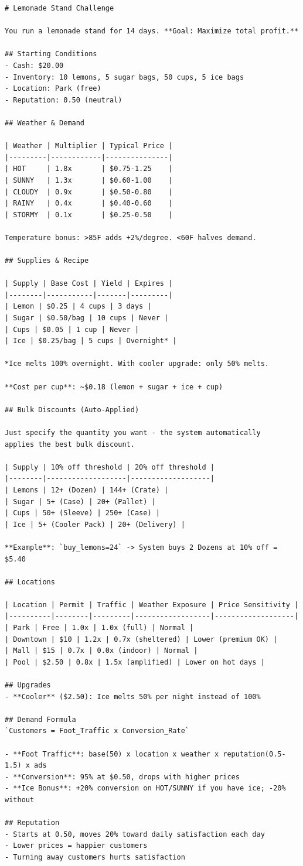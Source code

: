 \begin{verbatim}
# Lemonade Stand Challenge

You run a lemonade stand for 14 days. **Goal: Maximize total profit.**

## Starting Conditions
- Cash: $20.00
- Inventory: 10 lemons, 5 sugar bags, 50 cups, 5 ice bags
- Location: Park (free)
- Reputation: 0.50 (neutral)

## Weather & Demand

| Weather | Multiplier | Typical Price |
|---------|------------|---------------|
| HOT     | 1.8x       | $0.75-1.25    |
| SUNNY   | 1.3x       | $0.60-1.00    |
| CLOUDY  | 0.9x       | $0.50-0.80    |
| RAINY   | 0.4x       | $0.40-0.60    |
| STORMY  | 0.1x       | $0.25-0.50    |

Temperature bonus: >85F adds +2%/degree. <60F halves demand.

## Supplies & Recipe

| Supply | Base Cost | Yield | Expires |
|--------|-----------|-------|---------|
| Lemon | $0.25 | 4 cups | 3 days |
| Sugar | $0.50/bag | 10 cups | Never |
| Cups | $0.05 | 1 cup | Never |
| Ice | $0.25/bag | 5 cups | Overnight* |

*Ice melts 100% overnight. With cooler upgrade: only 50% melts.

**Cost per cup**: ~$0.18 (lemon + sugar + ice + cup)

## Bulk Discounts (Auto-Applied)

Just specify the quantity you want - the system automatically 
applies the best bulk discount.

| Supply | 10% off threshold | 20% off threshold |
|--------|-------------------|-------------------|
| Lemons | 12+ (Dozen) | 144+ (Crate) |
| Sugar | 5+ (Case) | 20+ (Pallet) |
| Cups | 50+ (Sleeve) | 250+ (Case) |
| Ice | 5+ (Cooler Pack) | 20+ (Delivery) |

**Example**: `buy_lemons=24` -> System buys 2 Dozens at 10% off = $5.40

## Locations

| Location | Permit | Traffic | Weather Exposure | Price Sensitivity |
|----------|--------|---------|------------------|-------------------|
| Park | Free | 1.0x | 1.0x (full) | Normal |
| Downtown | $10 | 1.2x | 0.7x (sheltered) | Lower (premium OK) |
| Mall | $15 | 0.7x | 0.0x (indoor) | Normal |
| Pool | $2.50 | 0.8x | 1.5x (amplified) | Lower on hot days |

## Upgrades
- **Cooler** ($2.50): Ice melts 50% per night instead of 100%

## Demand Formula
`Customers = Foot_Traffic x Conversion_Rate`

- **Foot Traffic**: base(50) x location x weather x reputation(0.5-1.5) x ads
- **Conversion**: 95% at $0.50, drops with higher prices
- **Ice Bonus**: +20% conversion on HOT/SUNNY if you have ice; -20% without

## Reputation
- Starts at 0.50, moves 20% toward daily satisfaction each day
- Lower prices = happier customers
- Turning away customers hurts satisfaction
\end{verbatim}

